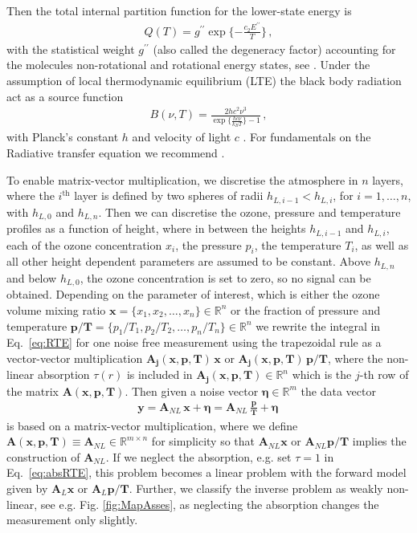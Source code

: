 Then the total internal partition function for the lower-state energy is
\begin{align}
	Q(T )= g^{\prime \prime} \exp{\{ - \frac{ c_2 E^{\prime \prime} }{T}\}} \, ,
\end{align}
with the statistical weight $ g^{\prime \prime}$ (also called the degeneracy factor) accounting for the molecules non-rotational and rotational energy states, see \cite{vsimevckova2006einstein}.
Under the assumption of local thermodynamic equilibrium (LTE) the black body radiation act as a source function
\begin{align}
	B(\nu,T)   = \frac{2 h c^2 \nu^3}{\exp{\{\frac{hc\nu}{k_B T}\}}-1}\, ,
\end{align}
with Planck's constant $h$ and velocity of light $c$ \cite{}.
For fundamentals on the Radiative transfer equation we recommend \cite[Chapter 1]{rybicki2000rte}.

To enable matrix-vector multiplication, we discretise the atmosphere in $n$ layers, where the $i^\text{th}$ layer is defined by two spheres of radii $h_{L,i-1} < h_{L,i}$, for $i = 1, \dots, n$, with $h_{L,0}$ and $h_{L,n} $.
Then we can discretise the ozone, pressure and temperature profiles as a function of height, where in between the heights $h_{L,i-1}$ and $h_{L,i}$, each of the ozone concentration $x_{i}$, the pressure $p_{i}$, the temperature $T_{i}$, as well as all other height dependent parameters are assumed to be constant.
Above $h_{L, n}$ and below $h_{L,0} $, the ozone concentration is set to zero, so no signal can be obtained.
Depending on the parameter of interest, which is either the ozone volume mixing ratio $\bm{x} =\{x_1,x_2,\ldots,x_n\} \in \mathbb{R}^{n}$ or the fraction of pressure and temperature $\bm{p/T}= \{p_1/T_1,p_2/T_2,\ldots,p_n/T_n\} \in \mathbb{R}^{n} $
we rewrite the integral in Eq.~\eqref{eq:RTE} for one noise free measurement using the trapezoidal rule as a vector-vector multiplication $\bm{A_{j}}(\bm{x},  \bm{p},\bm{T}) \, \bm{x} $ or $\bm{A_{j}}(\bm{x},  \bm{p},\bm{T}) \, \bm{p}/ \bm{T} $, where the non-linear absorption $\tau(r)$ is included in $\bm{A_{j}}(\bm{x},  \bm{p},\bm{T}) \in \mathbb{R}^{n}$ which is the $j$-th row of the matrix $\bm{A}(\bm{x},  \bm{p},\bm{T})$.
Then given a noise vector $\bm{\eta} \in \mathbb{R}^{m}$ the data vector
\begin{align}
	\bm{y} = \bm{A}_{NL} \, \bm{x} + \bm{\eta}= \bm{A}_{NL} \,
	\frac{ \bm{p}}{\bm{T}} + \bm{\eta} \, 
\end{align}
is based on a matrix-vector multiplication, where we define $\bm{A}(\bm{x},  \bm{p},\bm{T}) \equiv \bm{A}_{NL} \in \mathbb{R}^{m \times n}$ for simplicity so that $\bm{A}_{NL}\bm{x}$ or $\bm{A}_{NL}\bm{p}/\bm{T}$ implies the construction of $\bm{A}_{NL}$.
If we neglect the absorption, e.g. set $\tau = 1$ in Eq.~\eqref{eq:absRTE}, this problem becomes a linear problem with the forward model given by $\bm{A}_{L}\bm{x}$ or $\bm{A}_{L}\bm{p}/\bm{T}$. 
Further, we classify the inverse problem as weakly non-linear, see e.g. Fig. \ref{fig:MapAsses}, as neglecting the absorption changes the measurement only slightly.

